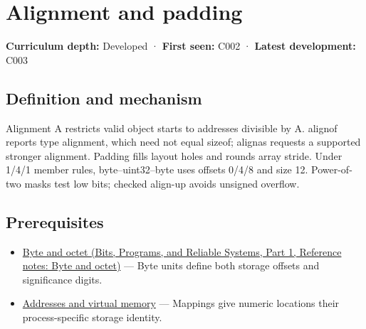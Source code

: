 \hypertarget{appendix-a1f7c53b4742}{}\label{referencestart:appendix-a1f7c53b4742}
\section{Alignment and padding}\label{appendix-a1f7c53b4742-alignment-and-padding}

\hypertarget{appendix-a1f7c53b4742-alignment-and-padding}{}

\textbf{Curriculum depth:} Developed · \textbf{First seen:} C002 · \textbf{Latest development:} C003

\begin{allmightroledefinition}

\subsection{Definition and mechanism}\label{appendix-a1f7c53b4742-definition-and-mechanism}

\hypertarget{appendix-a1f7c53b4742-definition-and-mechanism}{}

Alignment A restricts valid object starts to addresses divisible by A. alignof reports type alignment, which need not equal sizeof; alignas requests a supported stronger alignment. Padding fills layout holes and rounds array stride. Under 1/4/1 member rules, byte--uint32--byte uses offsets 0/4/8 and size 12. Power-of-two masks test low bits; checked align-up avoids unsigned overflow.

\end{allmightroledefinition}

\subsection{Prerequisites}\label{appendix-a1f7c53b4742-prerequisites}

\hypertarget{appendix-a1f7c53b4742-prerequisites}{}

\begin{itemize}
\tightlist
\item
  \href{../01-Bits-Programs-and-Reliable-Systems-P01/main.pdf\#appendix-5bee2df85484}{Byte and octet (Bits, Programs, and Reliable Systems, Part 1, Reference notes: Byte and octet)} --- Byte units define both storage offsets and significance digits.
\item
  \hyperref[appendix-18ee4f913c3c]{Addresses and virtual memory} --- Mappings give numeric locations their process-specific storage identity.
\end{itemize}

